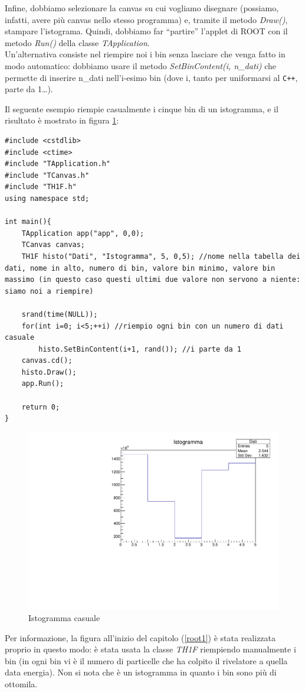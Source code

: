 Infine, dobbiamo selezionare la canvas su cui vogliamo disegnare (possiamo, infatti, avere più canvas nello stesso programma) e, tramite il metodo \emph{Draw()}, stampare l'istograma. Quindi, dobbiamo far ``partire'' l'applet di ROOT con il metodo \emph{Run()} della classe \emph{TApplication}.\\

Un'alternativa consiste nel riempire noi i bin senza lasciare che venga fatto in modo automatico: dobbiamo usare il metodo \emph{SetBinContent(\emph{i, n\_dati})} che permette di inserire n\_dati nell'i-esimo bin (dove i, tanto per uniformarsi al \verb|C++|, parte da 1\ldots). 

Il seguente esempio riempie casualmente i cinque bin di un istogramma, e il risultato è mostrato in figura \ref{root4}:
\begin{lstlisting}
#include <cstdlib>
#include <ctime>
#include "TApplication.h"
#include "TCanvas.h"
#include "TH1F.h"
using namespace std;

int main(){
	TApplication app("app", 0,0);
	TCanvas canvas;
	TH1F histo("Dati", "Istogramma", 5, 0,5); //nome nella tabella dei dati, nome in alto, numero di bin, valore bin minimo, valore bin massimo (in questo caso questi ultimi due valore non servono a niente: siamo noi a riempire)

	srand(time(NULL));    
	for(int i=0; i<5;++i) //riempio ogni bin con un numero di dati casuale
		histo.SetBinContent(i+1, rand()); //i parte da 1
	canvas.cd();
	histo.Draw();
	app.Run();

	return 0;
}
\end{lstlisting}

\begin{figure} [h]
	\centering
	\includegraphics[scale=\scaledim]{Immagini/histo2.pdf}  
	\caption{Istogramma casuale}
	\label{root4}
\end{figure}
Per informazione, la figura all'inizio del capitolo (\ref{root1}) è stata realizzata proprio in questo modo: è stata usata la classe \emph{TH1F} riempiendo manualmente i bin (in ogni bin vi è il numero di particelle che ha colpito il rivelatore a quella data energia). Non si nota che è un istogramma in quanto i bin sono più di ottomila.
